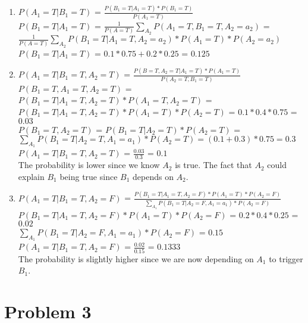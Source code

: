 \documentclass{article}
\begin{document}
\begin{enumerate}

  \item{

    $P(A_1=T|B_1=T)$ = $\frac{P(B_1=T|A_1=T)*P(B_1=T)}{P(A_1=T)}$\\
    $P(B_1=T|A_1=T)$ = $\frac{1}{P(A=T)} \sum_{A_2}P(A_1=T,B_1=T,A_2=a_2)$ = $\frac{1}{P(A=T)}\sum_{A_2}P(B_1=T|A_1=T,A_2=a_2)*P(A_1=T)*P(A_2=a_2)$\\
    $P(B_1=T|A_1=T)$ = $0.1*0.75+0.2*0.25$ = $0.125$\\
  }

  \item{

    $P(A_1=T|B_1=T,A_2=T)$ = $\frac{P(B=T,A_2=T|A_1=T)*P(A_1=T)}{P(A_2=T,B_1=T)}$\\
    $P(B_1=T,A_1=T,A_2=T)$ = $P(B_1=T|A_1=T,A_2=T)*P(A_1=T,A_2=T)$ = $P(B_1=T|A_1=T,A_2=T)*P(A_1=T)*P(A_2=T)$ = $0.1*0.4*0.75$ = $0.03$\\
    $P(B_1=T,A_2=T)$ = $P(B_1=T|A_2=T)*P(A_2=T)$ = $\sum_{A_1}P(B_1=T|A_2=T,A_1=a_1)*P(A_2=T)=(0.1+0.3)*0.75=0.3$\\
    $P(A_1=T|B_1=T,A_2=T)$ = $\frac{0.03}{0.3}$ = $0.1$\\

    The probability is lower since we know $A_2$ is true. The fact that $A_2$ could explain $B_1$ being true since $B_1$ depends on $A_2$.\\
  }

  \item{

    $P(A_1=T|B_1=T,A_2=F)$ = $\frac{P(B_1=T|A_1=T,A_2=F)*P(A_1=T)*P(A_2=F)}{\sum_{A_1}P(B_1=T|A_2=F,A_1=a_1)*P(A_2=F)}$\\
    $P(B_1=T|A_1=T,A_2=F)*P(A_1=T)*P(A_2=F)$ = $0.2*0.4*0.25$ = $0.02$\\
    $\sum_{A_1}P(B_1=T|A_2=F,A_1=a_1)*P(A_2=F)$ = $0.15$\\
    $P(A_1=T|B_1=T,A_2=F)$ = $\frac{0.02}{0.15}$ = $0.1333$\\

    The probability is slightly higher since we are now depending on $A_1$ to trigger $B_1$.\\
  }

\end{enumerate}

\section{Problem 3}
\end{document}
